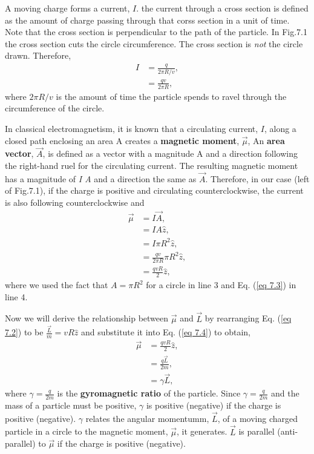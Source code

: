 \documentclass{article}
\begin{document}
A moving charge forms a current, $I$. the current through a cross section is defined as 
the amount of charge passing through that corss section in a unit of time.
Note that the cross section is perpendicular to the path of the particle. In Fig.7.1 the cross
section cuts the circle circumference. The cross section is \textit{not} the circle drawn. Therefore,
\begin{align*}\label{eq 7.3}
    I&=\frac{q}{2\pi R/v},\\
    &=\frac{qv}{2\pi R}, \tag{7.3}
\end{align*}
where $2\pi R/v$ is the amount of time the particle spends to ravel through the circumference
of the circle.

In classical electromagnetism, it is known that a circulating current, $I$, along a
closed path enclosing an area A creates a \textbf{magnetic moment}, $\vec{\mu}$, An
\textbf{area vector}, $\vec{A}$, is defined as a vector with a magnitude A and a direction following
the right-hand ruel for the circulating current. The resulting magnetic moment has a magnitude
of \textit{I A} and a direction the same as $\vec{A}$. Therefore, in our case (left of Fig.7.1),
if the charge is positive and circulating counterclockwise, the current is also following
counterclockwise and
\begin{align*}\label{eq 7.4}
    \vec{\mu}&=I\vec{A},\\
    &=I A \hat{z},\\
    &=I \pi R^2\hat{z},\\
    &=\frac{qv}{2\pi R}\pi R^2\hat{z},\\
    &=\frac{qvR}{2}\hat{z}, \tag{7.4}
\end{align*} 
where we used the fact that $A=\pi R^2$ for a circle in line 3 and Eq. (\ref{eq 7.3})
in line 4.

Now we will derive the relationship between $\vec{\mu}$ and $\vec{L}$ by rearranging Eq. (\ref{eq 7.2})
to be $\frac{\vec{L}}{m}=vR\hat{z}$ and substitute it into Eq. (\ref{eq 7.4}) to obtain,
\begin{align*}\label{eq 7.5}
    \vec{\mu}&=\frac{qvR}{2}\hat{z},\\
    &=\frac{q\vec{L}}{2m},\\
    &=\gamma\vec{L},\tag{7.5}
\end{align*}
where $\gamma=\frac{q}{2m}$ is the \textbf{gyromagnetic ratio} of the particle.
Since $\gamma=\frac{q}{2m}$ and the mass of a particle must be positive,
$\gamma$ is positive (negative) if the charge is positive (negative). $\gamma$
relates the angular momentumm, $\vec{L}$, of a moving charged particle in a 
circle to the magnetic moment, $\vec{\mu}$, it generates. $\vec{L}$ is parallel (anti-parallel)
to $\vec{\mu}$ if the charge is positive (negative).
\end{document}
